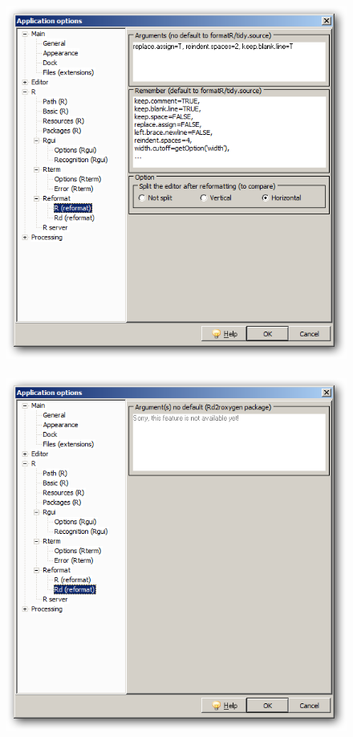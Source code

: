 \begin{figure}[h!]
  \includegraphics[scale=0.33]{./res/app_r_reformat_r.png}~~
  \includegraphics[scale=0.33]{./res/app_r_reformat_rd.png}~~

\end{figure}
